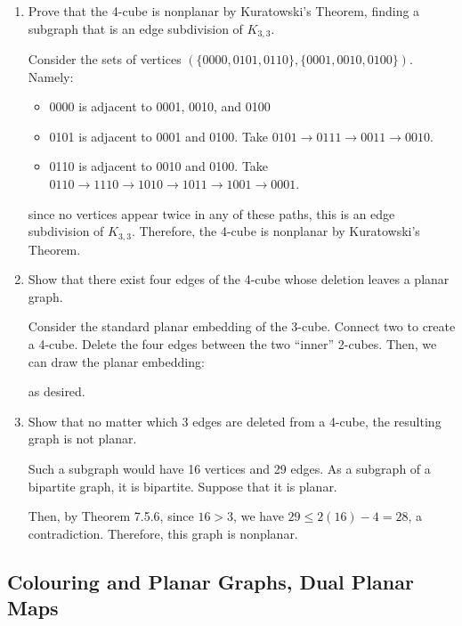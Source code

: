 \begin{xca}\end{xca}
\begin{enumerate}
  \item Prove that the 4-cube is nonplanar by Kuratowski's Theorem,
        finding a subgraph that is an edge subdivision of $K_{3,3}$.
        \begin{prf}
          Consider the sets of vertices
          $(\{0000, 0101, 0110\}, \{0001, 0010, 0100\})$.
          Namely:
          \begin{itemize}
            \item 0000 is adjacent to 0001, 0010, and 0100
            \item 0101 is adjacent to 0001 and 0100. Take $0101 \to 0111 \to 0011 \to 0010$.
            \item 0110 is adjacent to 0010 and 0100. Take $0110 \to 1110 \to 1010 \to 1011 \to 1001 \to 0001$.
          \end{itemize}
          since no vertices appear twice in any of these paths,
          this is an edge subdivision of $K_{3,3}$.
          Therefore, the 4-cube is nonplanar by Kuratowski's Theorem.
        \end{prf}
  \item Show that there exist four edges of the 4-cube
        whose deletion leaves a planar graph.
        \begin{prf}
          Consider the standard planar embedding of the 3-cube.
          Connect two to create a 4-cube.
          Delete the four edges between the two ``inner'' 2-cubes.
          Then, we can draw the planar embedding:
          \begin{center}
          \end{center}
          as desired.
        \end{prf}
  \item Show that no matter which 3 edges are deleted from a 4-cube,
        the resulting graph is not planar.
        \begin{prf}
          Such a subgraph would have 16 vertices and 29 edges.
          As a subgraph of a bipartite graph, it is bipartite.
          Suppose that it is planar.

          Then, by Theorem 7.5.6, since $16 > 3$,
          we have $29 \leq 2(16)-4 = 28$, a contradiction.
          Therefore, this graph is nonplanar.
        \end{prf}
\end{enumerate}

\setcounter{subsection}{7}
\subsection{Colouring and Planar Graphs, Dual Planar Maps}
